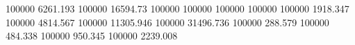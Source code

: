 100000   6261.193   %
100000   16594.73   %
100000   100000     %
100000   100000     %
100000   1918.347   %
100000   4814.567   %
100000   11305.946  %
100000   31496.736  %
100000   288.579    %
100000   484.338    %
100000   950.345    %
100000   2239.008   %
